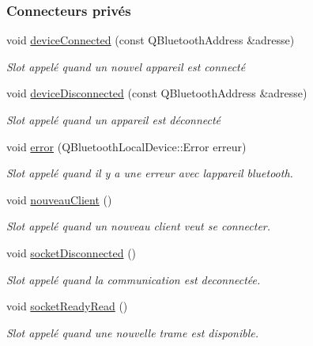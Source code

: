\subsubsection*{Connecteurs privés}
\begin{DoxyCompactItemize}
\item 
void \hyperlink{class_communication_a33db5c9db5da71c20c8c544d1de4eb9a}{device\+Connected} (const Q\+Bluetooth\+Address \&adresse)
\begin{DoxyCompactList}\small\item\em Slot appelé quand un nouvel appareil est connecté \end{DoxyCompactList}\item 
void \hyperlink{class_communication_a0ee021f517bb0e3f7149ed13f8faf0b1}{device\+Disconnected} (const Q\+Bluetooth\+Address \&adresse)
\begin{DoxyCompactList}\small\item\em Slot appelé quand un appareil est déconnecté \end{DoxyCompactList}\item 
void \hyperlink{class_communication_af95addb3c2bc178cfd7c92c6f94680a4}{error} (Q\+Bluetooth\+Local\+Device\+::\+Error erreur)
\begin{DoxyCompactList}\small\item\em Slot appelé quand il y a une erreur avec l\textquotesingle{}appareil bluetooth. \end{DoxyCompactList}\item 
void \hyperlink{class_communication_ac1bc22603b6e05389f94890b745aac4f}{nouveau\+Client} ()
\begin{DoxyCompactList}\small\item\em Slot appelé quand un nouveau client veut se connecter. \end{DoxyCompactList}\item 
void \hyperlink{class_communication_a44f863f2c70f4be652224240447c9fe0}{socket\+Disconnected} ()
\begin{DoxyCompactList}\small\item\em Slot appelé quand la communication est deconnectée. \end{DoxyCompactList}\item 
void \hyperlink{class_communication_a0576a95d1f3c4ec49172a1040cfbeedf}{socket\+Ready\+Read} ()
\begin{DoxyCompactList}\small\item\em Slot appelé quand une nouvelle trame est disponible. \end{DoxyCompactList}\end{DoxyCompactItemize}
